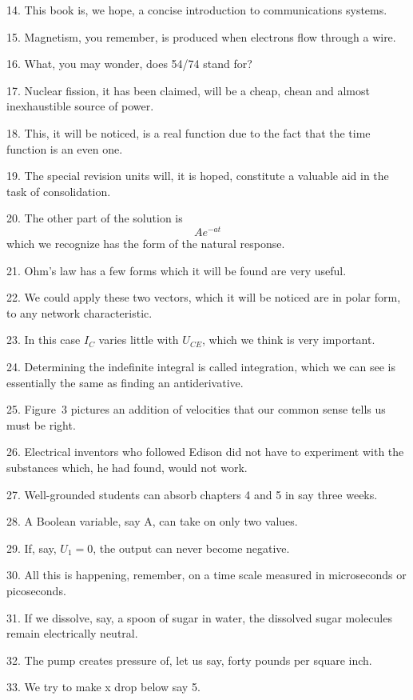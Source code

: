 \documentclass[a4paper,twocolumn,10pt]{article}
\begin{document}
\begin{CJK}{UTF8}{gkai}
	14. This book is, we hope, a concise introduction to communications systems.

	15. Magnetism, you remember, is produced when electrons flow through a wire.

	16. What, you may wonder, does 54/74 stand for?

	17. Nuclear fission, it has been claimed, will be a cheap, chean and almost inexhaustible
	source of power.

	18. This, it will be noticed, is a real function due to the fact that the time function
	is an even one.

	19. The special revision units will, it is hoped, constitute a valuable aid in the task
	of consolidation.

	20. The other part of the solution is \[A e^{-at}\]
	which we recognize has the form of the natural response.

	21. Ohm's law has a few forms which it will be found are very useful.

	22. We could apply these two vectors, which it will be noticed are in polar form,
	to any network characteristic.

	23. In this case $I_C$ varies little with $U_{CE}$, which we think is very important.

	24. Determining the indefinite integral is called integration, which we can see is
	essentially the same as finding an antiderivative.

	25. Figure~3 pictures an addition of velocities that our common sense tells us must be right.

	26. Electrical inventors who followed Edison did not have to experiment with the substances
	which, he had found, would not work.

	27. Well-grounded students can absorb chapters 4 and 5 in say three weeks.

	28. A Boolean variable, say A, can take on only two values.

	29. If, say, $U_1 = 0$, the output can never become negative.

	30. All this is happening, remember, on a time scale measured in microseconds or picoseconds.

	31. If we dissolve, say, a spoon of sugar in water, the dissolved sugar molecules remain
	electrically neutral.

	32. The pump creates pressure of, let us say, forty pounds per square inch.

	33. We try to make x drop below say 5.


\end{CJK}
\end{document}
